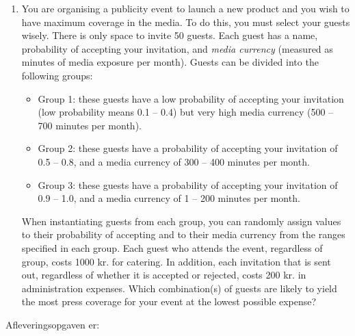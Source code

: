 \documentclass{article}
\begin{document}
\begin{enumerate}[label=11ø.\arabic*,start=0]
\item You are organising a publicity event to launch a new product and you wish to have maximum coverage in the media. To do this, you must select your guests wisely. There is only space to invite 50 guests. Each guest has a name, probability of accepting your invitation, and \textit{media currency} (measured as minutes of media exposure per month). Guests can be divided into the following groups:
\begin{itemize}
\item	Group 1: these guests have a low probability of accepting your invitation (low probability means 0.1 – 0.4) but very high media currency (500 – 700 minutes per month). 
\item	Group 2: these guests have a probability of accepting your invitation of 0.5 – 0.8, and a media currency of 300 – 400 minutes per month.
\item	Group 3: these guests have a probability of accepting your invitation of 0.9 – 1.0, and a media currency of 1 – 200 minutes per month. 
\end{itemize}
When instantiating guests from each group, you can randomly assign values to their probability of accepting and to their media currency from the ranges specified in each group. Each guest who attends the event, regardless of group, costs 1000 kr. for catering. In addition, each invitation that is sent out, regardless of whether it is accepted or rejected, costs 200 kr. in administration expenses. Which combination(s) of guests are likely to yield the most press coverage for your event at the lowest possible expense?


\end{enumerate}
Afleveringsopgaven er:
\end{document}
